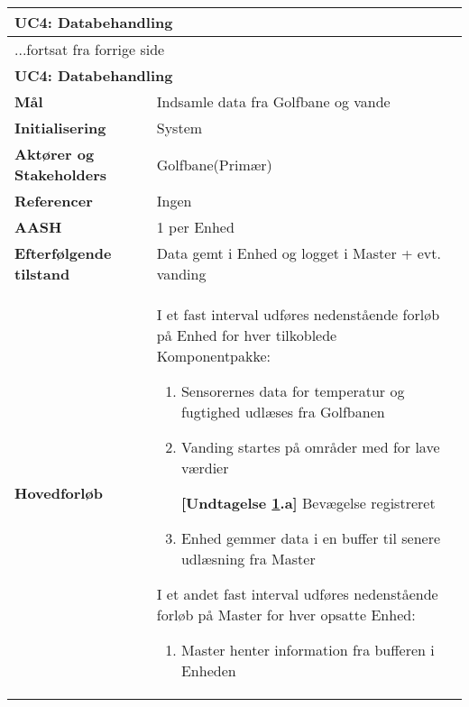 \begin{center} \centering \label{UC4}
	\begin{longtable}{|p{5cm}|p{9cm}|}  %
	\hline
		\multicolumn{2}{|l|}{\textbf{UC4: Databehandling}} \\\hline %
		\endfirsthead
		
		\multicolumn{2}{l}{...fortsat fra forrige side} \\ \hline %
		\multicolumn{2}{|l|}{\textbf{UC4: Databehandling}} \\\hline %
		\endhead	
		
		\textbf{Mål}								&Indsamle data fra Golfbane og vande		\\\hline
		\textbf{Initialisering}					&System				\\\hline
		\textbf{Aktører og Stakeholders}			&Golfbane(Primær)	\\\hline
		\textbf{Referencer}						&Ingen				\\\hline
		\textbf{AASH}							&1 per Enhed			\\\hline
		\textbf{Efterfølgende tilstand}			&Data gemt i Enhed og logget i Master + evt. vanding 	\\\hline
		\textbf{Hovedforløb}						
		
		&I et fast interval udføres nedenstående forløb på Enhed for hver tilkoblede Komponentpakke:
			\begin{enumerate}
			
				\item Sensorernes data for temperatur og fugtighed udlæses fra Golfbanen
				
				\item \label{uc4vandstart} Vanding startes på områder med for lave værdier
				
					\textbf{[Undtagelse \ref{uc4vandstart}.a]} Bevægelse registreret 				
				
				\item Enhed gemmer data i en buffer til senere udlæsning fra Master				
			
			\end{enumerate}
			
			I et andet fast interval udføres nedenstående forløb på Master for hver opsatte Enhed:
			\begin{enumerate}[resume]
			
				\item Master henter information fra bufferen i Enheden
				

\end{enumerate}
\end{longtable}
\end{center}
